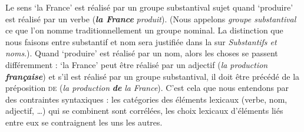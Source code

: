 Le sens ‘la France’ est réalisé par un groupe substantival sujet quand ‘produire’ est réalisé par un verbe (\textbf{\textit{la France}} \textit{produit}). (Nous appelons \textit{groupe substantival} ce que l’on nomme traditionnellement un groupe nominal. La distinction que nous faisons entre substantif et nom sera justifiée dans la  sur \textit{Substantifs et noms}.). Quand ‘produire’ est réalisé par un nom, alors les choses se passent différemment : ‘la France’ peut être réalisé par un adjectif (\textit{la production} \textbf{\textit{française}}) et s’il est réalisé par un groupe substantival, il doit être précédé de la préposition \textsc{de} (\textit{la production} \textbf{\textit{de}} \textit{la France}). C’est cela que nous entendons par des contraintes syntaxiques : les catégories des éléments lexicaux (verbe, nom, adjectif, …) qui se combinent sont corrélées, les choix lexicaux d’éléments liés entre eux se contraignent les uns les autres.

